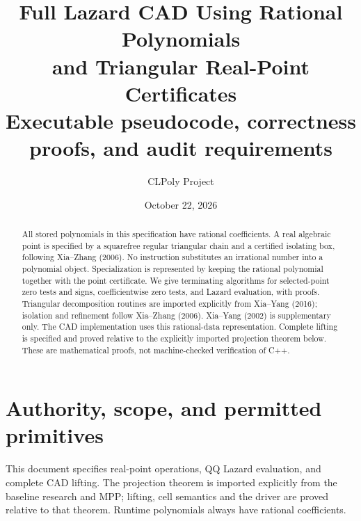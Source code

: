 \documentclass[11pt]{article}
\title{Full Lazard CAD Using Rational Polynomials\\and Triangular Real-Point Certificates\\\large Executable pseudocode, correctness proofs, and audit requirements}
\author{CLPoly Project}
\date{October 22, 2026}
\theoremstyle{definition}
\begin{document}
\maketitle
\begin{abstract}
All stored polynomials in this specification have rational coefficients. A real
algebraic point is specified by a squarefree regular triangular chain and a
certified isolating box, following Xia--Zhang (2006). No instruction substitutes
an irrational number into a polynomial object. Specialization is represented by
keeping the rational polynomial together with the point certificate. We give
terminating algorithms for selected-point zero tests and signs, coefficientwise
zero tests, and Lazard evaluation, with proofs. Triangular decomposition routines
are imported explicitly from Xia--Yang (2016); isolation and refinement follow
Xia--Zhang (2006). Xia--Yang (2002) is supplementary only. The CAD implementation uses this rational-data representation. Complete lifting is specified and
proved relative to the explicitly imported projection theorem below.
These are mathematical proofs, not machine-checked verification of C++.
\end{abstract}
\tableofcontents

\section{Authority, scope, and permitted primitives}
This document specifies real-point operations, QQ Lazard evaluation, and complete
CAD lifting. The projection theorem is imported explicitly from the baseline
research and MPP; lifting, cell semantics and the driver are proved relative
to that theorem. Runtime polynomials always have rational coefficients.
\end{document}
